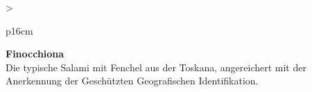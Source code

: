 \documentclass[
  beamerpaper,
  DIV=11,
  numbers=noendperiod,
  aspectratio=54]{scrreprt}
\begin{document}
\begin{table}

\caption{\label{tbl-panel-fleisch}Finocchiona}\begin{minipage}[t]{\linewidth}

\tabularnewline

\fontsize{16}{18}\selectfont
\begin{tabular}{>{\raggedright\arraybackslash}p{16cm}}
\toprule
\begingroup\fontsize{18}{20}\selectfont \textbf{Finocchiona}\endgroup\\
\midrule
Die typische Salami mit Fenchel aus der Toskana, angereichert mit der Anerkennung der Geschützten Geografischen Identifikation.\\
\bottomrule
\end{tabular}

\end{minipage}%
\newline
\begin{minipage}[t]{\linewidth}


\end{minipage}%

\end{table}

\break
\end{document}
